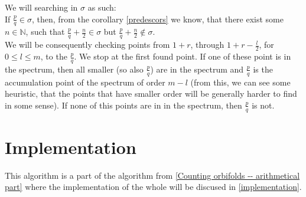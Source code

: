We will searching in $\sigma$ as such: \\

If $\frac{p}{q} \in \sigma$, then, from the corollary \ref{predescors} we know, that there 
exist some $n \in \mathbb{N}$, such that $\frac{p}{q} + \frac{n}{2} \in \sigma$ but 
$\frac{p}{q} + \frac{n}{2} \not\in \sigma$. \\

We will be consequently checking points from $1+r$, through $1+r-\frac{l}{2}$, for 
$0 \leq l \leq m$, to the $\frac{p}{q}$. We stop at the first found point. 
If one of these point is in the spectrum, then all smaller (so also $\frac{p}{q}$) are in 
the spectrum and $\frac{p}{q}$ is the accumulation point of the spectrum of order $m-l$ 
(from this, 
we can see some heuristic, that the points that have smaller order will be generally 
harder to find in some sense). If none of this points are in in the spectrum, then $\frac{p}{q}$ 
is not. \\

\section{Implementation}
This algorithm is a part of the algorithm from \ref{Counting orbifolds -- arithmetical part} 
where the implementation of the whole will be discused in \ref{implementation}.
